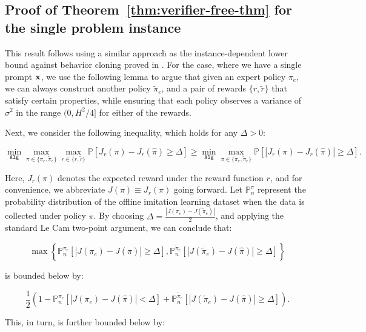 






\subsection{Proof of Theorem~\ref{thm:verifier-free-thm} for the single problem instance}
\label{subsec:proof-verifier-free-thm-single-problem}

This result follows using a similar approach as the instance-dependent lower bound against behavior cloning proved in \cite{foster2024behavior}.
For the case, where we have a single prompt $\mathbf{x}$, we use the following lemma to argue that given an expert policy $\pi_e$, we can always construct another policy $\tilde{\pi}_e$, and a pair of rewards $\{r, \tilde{r}\}$ that satisfy certain properties, while ensuring that each policy observes a variance of $\sigma^2$ in the range $(0, H^2/4]$ for either of the rewards.

Next, we consider the following inequality, which holds for any \(\Delta > 0\):

\[
\min_{\texttt{Alg}} \max_{\pi \in \{\pi_e, \tilde{\pi}_e\}} \max_{r \in \{r, \tilde{r}\}} \mathbb{P}\left[J_r(\pi) - J_r(\hat{\pi}) \geq \Delta \right]
\geq
\min_{\texttt{Alg}} \max_{\pi \in \{\pi_e, \tilde{\pi}_e\}} \mathbb{P}\left[\left|J_{r}(\pi) - J_{r}(\hat{\pi})\right| \geq \Delta \right].
\]

Here, \(J_r(\pi)\) denotes the expected reward under the reward function \(r\), and for convenience, we abbreviate \(J(\pi) \equiv J_{r}(\pi)\) going forward. Let \(\mathbb{P}_n^\pi\) represent the probability distribution of the offline imitation learning dataset when the data is collected under policy \(\pi\). By choosing \(\Delta = \frac{\left|J(\pi_e) - J(\tilde{\pi}_e)\right|}{2}\), and applying the standard Le Cam two-point argument, we can conclude that:

\[
\max\left\{
\mathbb{P}_n^{\pi_e}\left[\left|J(\pi_e) - J(\hat{\pi})\right| \geq \Delta\right],
\mathbb{P}_n^{\tilde{\pi}_e}\left[\left|J(\tilde{\pi}_e) - J(\hat{\pi})\right| \geq \Delta\right]
\right\}
\]

is bounded below by:

\[
\frac{1}{2} \left(
1 - \mathbb{P}_n^{\pi_e}\left[\left|J(\pi_e) - J(\hat{\pi})\right| < \Delta\right] +
\mathbb{P}_n^{\tilde{\pi}_e}\left[\left|J(\tilde{\pi}_e) - J(\hat{\pi})\right| \geq \Delta\right]
\right).
\]

This, in turn, is further bounded below by:

